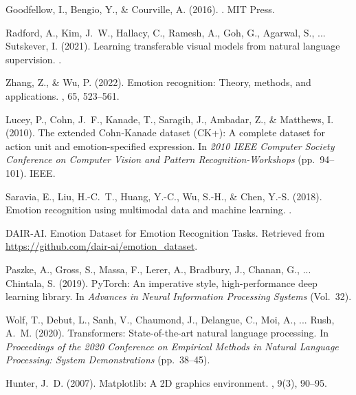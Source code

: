 \documentclass{article}
\theoremstyle{plain}
\theoremstyle{definition}
\theoremstyle{remark}
\begin{document}
\begin{thebibliography}{}

Goodfellow, I., Bengio, Y., \& Courville, A. (2016).
.
\newblock MIT Press.

Radford, A., Kim, J.~W., Hallacy, C., Ramesh, A., Goh, G., Agarwal, S., ...
  Sutskever, I. (2021).
\newblock Learning transferable visual models from natural language
  supervision.
.

Zhang, Z., \& Wu, P. (2022).
\newblock Emotion recognition: Theory, methods, and applications.
, 65, 523--561.

Lucey, P., Cohn, J.~F., Kanade, T., Saragih, J., Ambadar, Z., \& Matthews, I.
  (2010).
\newblock The extended Cohn-Kanade dataset (CK+): A complete dataset for action
  unit and emotion-specified expression.
\newblock In {\em 2010 IEEE Computer Society Conference on Computer Vision and
  Pattern Recognition-Workshops} (pp.\ 94--101). IEEE.

Saravia, E., Liu, H.-C.~T., Huang, Y.-C., Wu, S.-H., \& Chen, Y.-S. (2018).
\newblock Emotion recognition using multimodal data and machine learning.
.

DAIR-AI.
\newblock Emotion Dataset for Emotion Recognition Tasks.
\newblock Retrieved from \url{https://github.com/dair-ai/emotion_dataset}.

Paszke, A., Gross, S., Massa, F., Lerer, A., Bradbury, J., Chanan, G., ...
  Chintala, S. (2019).
\newblock PyTorch: An imperative style, high-performance deep learning library.
\newblock In {\em Advances in Neural Information Processing Systems} (Vol.~32).

Wolf, T., Debut, L., Sanh, V., Chaumond, J., Delangue, C., Moi, A., ...
  Rush, A.~M. (2020).
\newblock Transformers: State-of-the-art natural language processing.
\newblock In {\em Proceedings of the 2020 Conference on Empirical Methods in
  Natural Language Processing: System Demonstrations} (pp.\ 38--45).

Hunter, J.~D. (2007).
\newblock Matplotlib: A 2D graphics environment.
, 9(3), 90--95.


\end{thebibliography}
\end{document}
